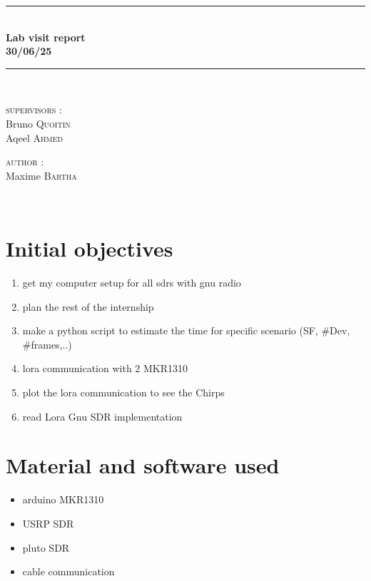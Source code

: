 \documentclass[a4paper, 12pt]{article}
\newcommand{\HRule}{\rule{\linewidth}{0.3mm}}
\begin{document}
\begin{center}
\HRule \\[0.3cm]
{ \LARGE \bfseries Lab visit report \\[0.3cm]}
{ \LARGE \bfseries 30/06/25 \\[0.1cm]} %
\HRule \\[1.5cm]

\begin{minipage}[t]{0.45\textwidth}
\begin{flushleft} \large
\textsc{supervisors :}\\
Bruno \textsc{Quoitin}\\
Aqeel \textsc{Ahmed}\\
\end{flushleft}

\end{minipage}
\begin{minipage}[t]{0.45\textwidth}
\begin{flushright} \large
\textsc{author :}\\
Maxime \textsc{Bartha}\\
\end{flushright}
\end{minipage}\\[2ex]
\end{center}


\section{Initial objectives}
\begin{enumerate}
  \item get my computer setup for all sdrs with gnu radio
  \item plan the rest of the internship
  \item make a python script to estimate the time for specific scenario (SF, \#Dev, \#frames,..)
  \item lora communication with 2 MKR1310
  \item plot the lora communication to see the Chirps 
  \item read Lora Gnu SDR implementation 
\end{enumerate}

\section{Material and software used}
\begin{itemize}
  \item arduino MKR1310
  \item USRP SDR
  \item pluto SDR
  \item cable communication
\end{itemize}
\end{document}
